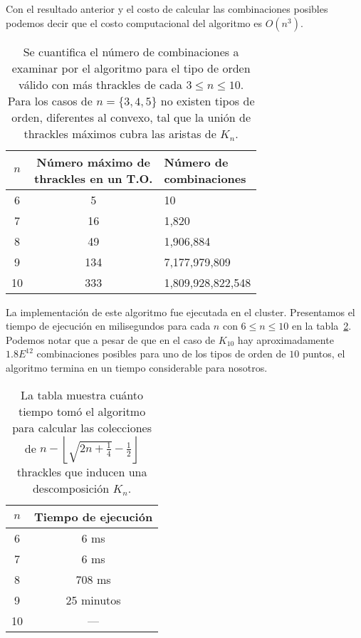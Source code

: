   Con el resultado anterior y el costo de calcular las combinaciones posibles podemos decir que el
  costo computacional del algoritmo es $O(n^3)$.

  \begin{table}[t]
    \centering
    \begin{tabular}{|c|c|l|}
      \hline
      $n$ & \makecell{Número máximo de \\ thrackles en un T.O.} & \makecell{Número de \\
      combinaciones} \\ \hline
      \hline
      6 & 5 & 10 \\ \hline
      7 & 16 & 1,820 \\\hline
      8 & 49 & 1,906,884 \\\hline
      9 & 134 & 7,177,979,809 \\\hline
      10 & 333 & 1,809,928,822,548 \\ \hline
    \end{tabular}
    \caption{Se cuantifica el número de combinaciones a examinar por el algoritmo para el tipo de
    orden válido con más thrackles de cada $ 3 \leq n \leq 10$. Para los casos de $n = \{3,4,5\}$
    no existen tipos de orden, diferentes al convexo, tal que la unión de thrackles máximos cubra
    las aristas de $K_n$.}
    \label{tabla:numero_operaciones_thrackles_maximos}
  \end{table}

  La implementación de este algoritmo fue ejecutada en el cluster. Presentamos el tiempo de
  ejecución en milisegundos para cada $n$ con $6\leq n \leq 10$ en la
  tabla~\ref{tabla:tiempo_thrackles_maximos}. Podemos notar que a pesar de que en el caso de
  $K_{10}$ hay aproximadamente $1.8E^{12}$ combinaciones posibles para uno de los tipos de orden de
  $10$ puntos, el algoritmo termina en un tiempo considerable para nosotros.
  \begin{table}
    \centering
    \begin{tabular}{|c|c|}
      \hline
      $n$ & Tiempo de ejecución \\ \hline \hline
      6   & 6 ms \\ \hline
      7   & 6 ms \\ \hline
      8   & 708 ms \\ \hline
      9   & 25 minutos \\ \hline
      10  & --- \\ \hline
    \end{tabular}
    \caption{La tabla muestra cuánto tiempo tomó el algoritmo para calcular las colecciones de $n -
    \left\lfloor\sqrt{2n + \frac{1}{4}} - \frac{1}{2}\right\rfloor$ thrackles que inducen una descomposición $K_n$.}
    \label{tabla:tiempo_thrackles_maximos}
  \end{table}

